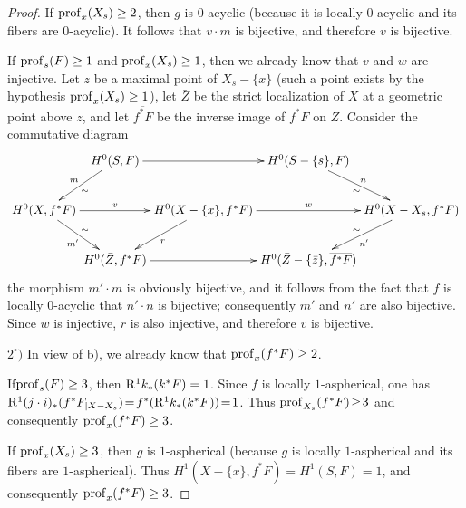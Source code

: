 \begin{proof}
If $\prof_x(X_s)\geq 2$, then $g$ is $0$-acyclic (because it is locally $0$-acyclic and its fibers are $0$-acyclic). It follows that $v\cdot m$ is bijective, and therefore $v$ is bijective.

If $\prof_s(F)\geq 1$ and $\prof_x(X_s)\geq 1$, then we already know that $v$ and $w$ are injective. Let $z$ be a maximal point of $X_s-\{x\}$ (such a point exists by the hypothesis $\prof_x(X_s)\geq 1$), let $\bar Z$ be the strict localization of $X$ at a geometric point above $z$, and let $\overline{f^*F}$ be the inverse image of $f^*F$ on $\bar Z$. Consider the commutative diagram
\begin{equation*}
\xymatrix@C=0mm{
&H^0(S, F)\ar[rr]\ar[ld]_{m}^{\sim}&&H^0(S-\{s\}, F)\ar[rd]_{\sim}^{n}\\
H^0(X, f^*F)\ar[rr]^-{v}\ar[rd]_{m'}^{\sim}&&H^0(X-\{x\}, f^*F)\ar[rr]^-{w}\ar[ld]^r&& H^0(X-X_s, f^*F)\ar[ld]^{n'}_{\sim}\\
&H^0(\bar Z, f^*F)\ar[rr]&&H^0(\bar Z-\{\bar z\}, \overline{f^*F})}
\end{equation*}
the morphism $m'\cdot m$ is obviously bijective, and it follows from the fact that $f$ is locally $0$-acyclic that $n'\cdot n$ is bijective; consequently $m'$ and $n'$ are also bijective. Since $w$ is injective, $r$ is also injective, and therefore $v$ is bijective.

$2^\circ)$ In view of b), we already know that $\prof_x(f^*F)\geq 2$.

If\pageoriginale $\prof_s(F)\geq 3$, then $\R^1k_*(k^*F)=1$. Since $f$ is locally $1$-aspherical, one has $\R^1(j\cdot i)_*(f^*\sisi{F{|X-X_s}}{F_{|X-X_s}})\!=\!f^*(\R^1k_*(k^*F))\!=\!1$. Thus \hbox{$\prof_{X_s}(f^*F)\!\geq\! 3$} and consequently $\prof_x(f^*F)\geq 3$.

If $\prof_x(X_s)\geq 3$, then $g$ is $1$-aspherical (because $g$ is locally $1$-aspherical and its fibers are $1$-aspherical). Thus $H^1(X-\{x\}, f^*F)=H^1(S, F)=1$, and consequently $\prof_x(f^*F)\geq 3$.


\end{proof}
